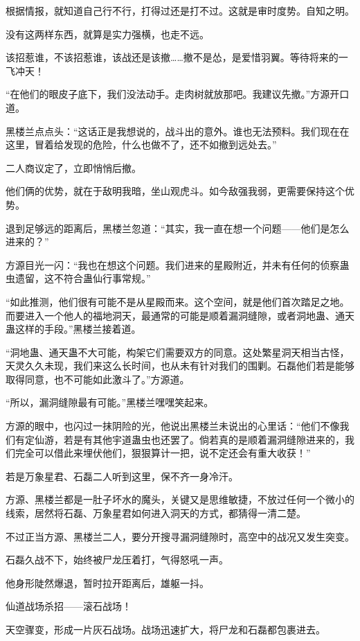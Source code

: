 \begin{this_body}
根据情报，就知道自己行不行，打得过还是打不过。这就是审时度势。自知之明。

没有这两样东西，就算是实力强横，也走不远。

该招惹谁，不该招惹谁，该战还是该撤……撤不是怂，是爱惜羽翼。等待将来的一飞冲天！

“在他们的眼皮子底下，我们没法动手。走肉树就放那吧。我建议先撤。”方源开口道。

黑楼兰点点头：“这话正是我想说的，战斗出的意外。谁也无法预料。我们现在在这里，冒着给发现的危险，什么也做不了，还不如撤到远处去。”

二人商议定了，立即悄悄后撤。

他们俩的优势，就在于敌明我暗，坐山观虎斗。如今敌强我弱，更需要保持这个优势。

退到足够远的距离后，黑楼兰忽道：“其实，我一直在想一个问题——他们是怎么进来的？”

方源目光一闪：“我也在想这个问题。我们进来的星殿附近，并未有任何的侦察蛊虫遗留，这不符合蛊仙行事常规。”

“如此推测，他们很有可能不是从星殿而来。这个空间，就是他们首次踏足之地。而要进入一个他人的福地洞天，最通常的可能是顺着漏洞缝隙，或者洞地蛊、通天蛊这样的手段。”黑楼兰接着道。

“洞地蛊、通天蛊不大可能，构架它们需要双方的同意。这处繁星洞天相当古怪，天灵久久未现，我们来这么长时间，也从未有针对我们的围剿。石磊他们若是能够取得同意，也不可能如此激斗了。”方源道。

“所以，漏洞缝隙最有可能。”黑楼兰嘿嘿笑起来。

方源的眼中，也闪过一抹阴险的光，他说出黑楼兰未说出的心里话：“他们不像我们有定仙游，若是有其他宇道蛊虫也还罢了。倘若真的是顺着漏洞缝隙进来的，我们完全可以借此来埋伏他们，狠狠算计一把，说不定还会有重大收获！”

若是万象星君、石磊二人听到这里，保不齐一身冷汗。

方源、黑楼兰都是一肚子坏水的魔头，关键又是思维敏捷，不放过任何一个微小的线索，居然将石磊、万象星君如何进入洞天的方式，都猜得一清二楚。

不过正当方源、黑楼兰二人，要分开搜寻漏洞缝隙时，高空中的战况又发生突变。

石磊久战不下，始终被尸龙压着打，气得怒吼一声。

他身形陡然爆退，暂时拉开距离后，雄躯一抖。

仙道战场杀招——滚石战场！

天空骤变，形成一片灰石战场。战场迅速扩大，将尸龙和石磊都包裹进去。


\end{this_body}
